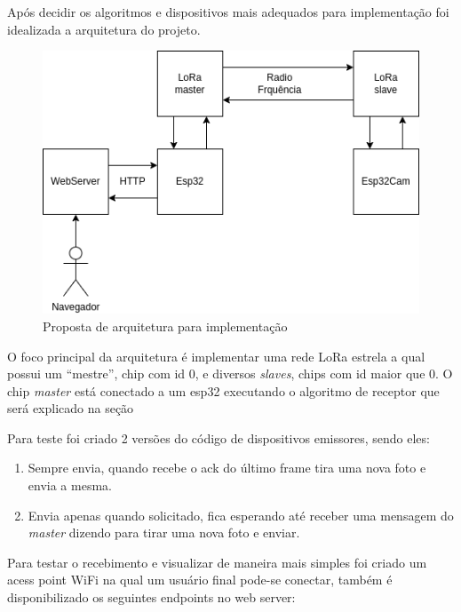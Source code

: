 \documentclass[
article,			%
12pt,				%
oneside,			%
a4paper,			%
english,			%
brazil,				%
sumario=tradicional
]{abntex2}
\begin{document}
Após decidir os algoritmos e dispositivos mais adequados para implementação foi idealizada a arquitetura do projeto.

\begin{figure}[!htb]
    \centering
    \includegraphics[width=.9\textwidth]{arch}
    \caption{\label{fig:arch}Proposta de arquitetura para implementação}
\end{figure}

O foco principal da arquitetura é implementar uma rede LoRa estrela a qual possui um ``mestre'', chip com id 0, e diversos \textit{slaves}, chips com id maior que 0. O chip \textit{master} está conectado a um esp32 executando o algoritmo de receptor que será explicado na seção 

Para teste foi criado 2 versões do código de dispositivos emissores, sendo eles:
\begin{enumerate}
    \item Sempre envia, quando recebe o ack do último frame tira uma nova foto e envia a mesma.
    \item Envia apenas quando solicitado, fica esperando até receber uma mensagem do \textit{master} dizendo para tirar uma nova foto e enviar.
\end{enumerate}

Para testar o recebimento e visualizar de maneira mais simples foi criado um acess point WiFi na qual um usuário final pode-se conectar, também é disponibilizado os seguintes endpoints no web server:
\end{document}
